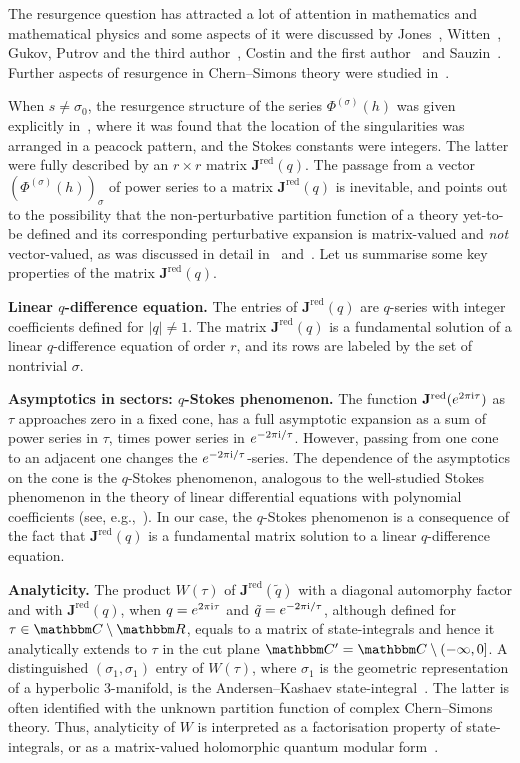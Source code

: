 \documentclass[12pt,reqno]{amsart}
\theoremstyle{definition}
\def\BR{\mathbbm R}
\def\BC{\mathbbm C}
\def\s{\sigma}
\def\tq{\tilde{q}}
\def\ri{\mathrm{i}}
\def\ri{{\rm i}}
\def\bJ{\mathbf J}
\def\RED{\mathrm{red}}
\begin{document}
The resurgence question has attracted a lot of attention in mathematics and
mathematical physics and some aspects of it were discussed by Jones~\cite{Jones:origin},
Witten~\cite{Witten:2010cx}, Gukov, Putrov and the third author~\cite{gmp},
Costin and the first author~\cite{CG} and Sauzin~\cite{Sauzin:resurgent}. Further
aspects of resurgence in Chern--Simons
theory were studied in~\cite{mmreview,gmp,gh-res,GZ:qseries,GZ:kashaev}.

When $s\neq \s_0$, the resurgence structure of the series
$\Phi^{(\s)}(h)$ was given explicitly in~\cite{GGM:resurgent}, where it was
found that the location of the singularities was arranged in a peacock pattern, and
the Stokes constants were integers. The latter were fully described by an $r \times r$
matrix $\bJ^\RED(q)$.
The passage from a vector $(\Phi^{(\s)}(h))_\s$ of power series to a matrix $\bJ^\RED(q)$
is inevitable, and points out to the possibility that the non-perturbative partition
function of a theory yet-to-be defined and its corresponding perturbative expansion is
matrix-valued and \emph{not} vector-valued, as was discussed in detail
in~\cite{GZ:kashaev} and~\cite{GZ:qseries}.
Let us summarise some key properties of the matrix $\bJ^\RED(q)$. 

\noindent
{\bf Linear $q$-difference equation.} 
The entries of $\bJ^\RED(q)$ are $q$-series with integer coefficients defined for
$|q| \neq 1$. The matrix $\bJ^\RED(q)$ is a fundamental solution of a linear
$q$-difference equation of order $r$, and its rows are labeled by the set of
nontrivial $\s$.

\noindent
{\bf Asymptotics in sectors: $q$-Stokes phenomenon.} 
The function $\bJ^\RED(e^{2\pi\ri\tau})$ as $\tau$ approaches zero in a fixed cone,
has a full asymptotic expansion as a sum of power series in $\tau$, times power
series in $e^{-2\pi\ri/\tau}$. However, passing from one cone to an adjacent one changes
the $e^{-2\pi\ri/\tau}$-series. The dependence of the asymptotics on the cone is the
$q$-Stokes phenomenon, analogous to the well-studied Stokes phenomenon in the theory
of linear differential equations with polynomial coefficients 
(see, e.g.,~\cite{Sibuya}). In our case, the $q$-Stokes phenomenon is a consequence 
of the fact that $\bJ^\RED(q)$ is a fundamental matrix solution to a linear 
$q$-difference equation. 

\noindent
{\bf Analyticity.} 
The product
$W(\tau)$ of $\bJ^\RED(\tq)$ with a diagonal automorphy factor and with $\bJ^\RED(q)$,
when $q=e^{2\pi\ri \tau}$ and $\tq=e^{-2\pi\ri/\tau}$, although defined for
$\tau \in \BC\setminus\BR$, equals to a matrix of state-integrals and hence it
analytically extends to $\tau$ in the cut plane $\BC'=\BC\setminus (-\infty, 0]$.
A distinguished $(\s_1,\s_1)$
entry of $W(\tau)$, where $\s_1$ is the geometric representation of a
hyperbolic 3-manifold, is the Andersen--Kashaev state-integral~\cite{AK}. The
latter is often identified with the unknown partition function of complex Chern--Simons
theory. Thus, analyticity of $W$ is interpreted as a factorisation property of
state-integrals, or as a matrix-valued holomorphic quantum modular
form~\cite{GZ:kashaev,Z:HQMF}.
 
\end{document}
